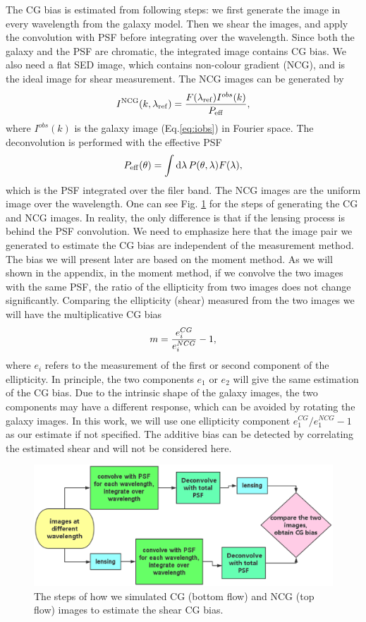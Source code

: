 \documentclass[useAMS,usenatbib]{mn2e}
\renewcommand{\d}{\mathrm{d}}
\newcommand{\be}{\begin{equation}}
\newcommand{\ee}{\end{equation}}
\begin{document}
The CG bias is estimated from following steps: we first generate the
image in every wavelength from the galaxy model. Then we shear the
images, and apply the convolution with PSF before integrating over the
wavelength. Since both the galaxy and the PSF are chromatic, the
integrated image contains CG bias. We also need a flat SED image,
which contains non-colour gradient (NCG), and is the ideal image for
shear measurement. The NCG images can be generated by
%
\be
I^{\rm NCG}(k, \lambda_{\rm ref}) = \dfrac{F(\lambda_{\rm ref}) I^{obs}(k)}
{P_{\rm eff}},
\ee
%
where $I^{obs}(k)$ is the galaxy image (Eq.\ref{eq:iobs}) in Fourier space.
The deconvolution is performed with the effective PSF
%
\be
P_{\rm eff}(\theta) = \int \d \lambda\, P(\theta,\lambda) F(\lambda),
\ee
%
which is the PSF integrated over the filer band.  The NCG images are
the uniform image over the wavelength. One can see
Fig. \ref{fig:flowchart} for the steps of generating the CG and NCG
images. In reality, the only difference is that if the lensing process
is behind the PSF convolution.  We need to emphasize here that the
image pair we generated to estimate the CG bias are independent of the
measurement method. The bias we will present later are based on the
moment method. As we will shown in the appendix, in the moment method,
if we convolve the two images with the same PSF, the ratio of the
ellipticity from two images does not change significantly.
%
Comparing the ellipticity (shear) measured from the two images we will
have the multiplicative CG bias \citep{2006MNRAS.368.1323H}
%
\be
m= {e_i^{CG} \over e_i^{NCG} }-1,
\ee
%
where $e_i$ refers to the measurement of the first or second component
of the ellipticity. In principle, the two components $e_1$ or $e_2$
will give the same estimation of the CG bias. Due to the intrinsic
shape of the galaxy images, the two components may have a different
response, which can be avoided by rotating the galaxy images.  In this
work, we will use one ellipticity component $e_1^{CG}/e_1^{NCG}-1$ as
our estimate if not specified. The additive bias can be detected by
correlating the estimated shear and will not be considered here.
%
\begin{figure}
\includegraphics[width=12.5cm]{colourg.eps}
\caption{The steps of how we simulated CG (bottom flow) and NCG (top
  flow) images to estimate the shear CG bias.}
\label{fig:flowchart}
\end{figure}
%
\end{document}
